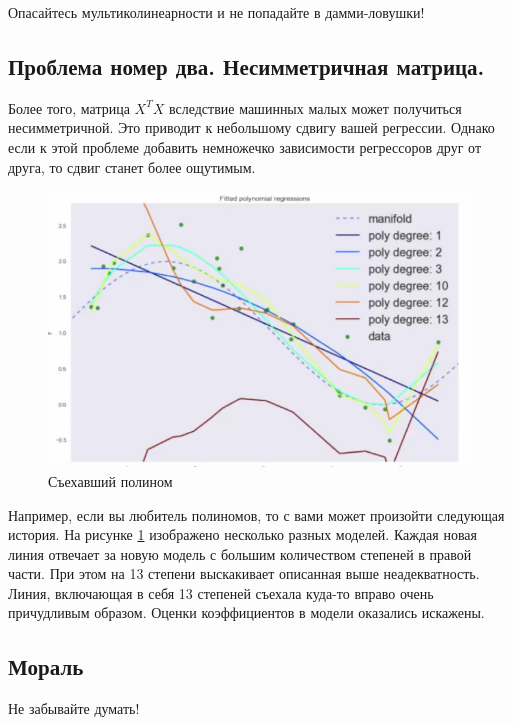 \documentclass[10pt,a4paper]{article}
\begin{document}
Опасайтесь мультиколинеарности и не попадайте в дамми-ловушки! 

\subsection{Проблема номер два. Несимметричная матрица.}

Более того, матрица $X^T X$ вследствие машинных малых может получиться несимметричной. Это приводит к небольшому сдвигу вашей регрессии. Однако если к этой проблеме добавить немножечко зависимости регрессоров друг от друга, то сдвиг станет более ощутимым.

\begin{figure}[H] \label{pic:1}
	\begin{center}
		\includegraphics[scale=0.4]{polinom.png}
	\end{center}
	\caption{Съехавший полином} 
\end{figure}

Например, если вы любитель полиномов, то с вами может произойти следующая история. На рисунке \ref{pic:1} изображено несколько разных моделей. Каждая новая линия отвечает за новую модель с большим количеством степеней в правой части. При этом на 13 степени выскакивает описанная выше неадекватность. Линия, включающая в себя 13 степеней съехала куда-то вправо очень причудливым образом. Оценки коэффициентов в модели оказались искажены. 

\subsection{Мораль} 

Не забывайте думать! 

 
  
 
\end{document}
